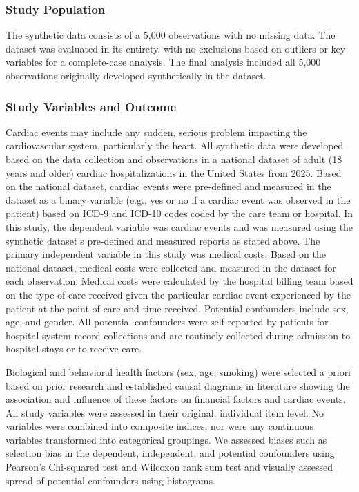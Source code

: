 \documentclass[
  letterpaper,
  DIV=11,
  numbers=noendperiod]{scrartcl}
\begin{document}
\subsubsection{Study Population}\label{study-population}

The synthetic data consists of a 5,000 observations with no missing
data. The dataset was evaluated in its entirety, with no exclusions
based on outliers or key variables for a complete-case analysis. The
final analysis included all 5,000 observations originally developed
synthetically in the dataset.

\subsubsection{Study Variables and
Outcome}\label{study-variables-and-outcome}

Cardiac events may include any sudden, serious problem impacting the
cardiovascular system, particularly the heart. All synthetic data were
developed based on the data collection and observations in a national
dataset of adult (18 years and older) cardiac hospitalizations in the
United States from 2025. Based on the national dataset, cardiac events
were pre-defined and measured in the dataset as a binary variable (e.g.,
yes or no if a cardiac event was observed in the patient) based on ICD-9
and ICD-10 codes coded by the care team or hospital. In this study, the
dependent variable was cardiac events and was measured using the
synthetic dataset's pre-defined and measured reports as stated above.
The primary independent variable in this study was medical costs. Based
on the national dataset, medical costs were collected and measured in
the dataset for each observation. Medical costs were calculated by the
hospital billing team based on the type of care received given the
particular cardiac event experienced by the patient at the point-of-care
and time received. Potential confounders include sex, age, and gender.
All potential confounders were self-reported by patients for hospital
system record collections and are routinely collected during admission
to hospital stays or to receive care.

Biological and behavioral health factors (sex, age, smoking) were
selected a priori based on prior research and established causal
diagrams in literature showing the association and influence of these
factors on financial factors and cardiac events. All study variables
were assessed in their original, individual item level. No variables
were combined into composite indices, nor were any continuous variables
transformed into categorical groupings. We assessed biases such as
selection bias in the dependent, independent, and potential confounders
using Pearson's Chi-squared test and Wilcoxon rank sum test and visually
assessed spread of potential confounders using histograms.
\end{document}
